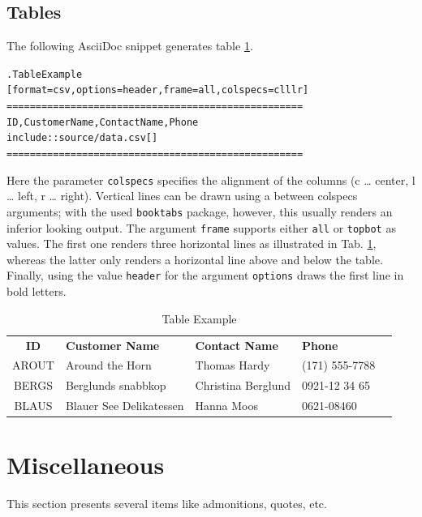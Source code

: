 \documentclass[10pt,a4paper,oneside,BCOR5mm]{scrartcl}
\begin{document}
\section{Tables}
\label{_tables}
 \par\noindent{}The following AsciiDoc snippet generates table \hyperlink{tab1}{1}.
\begin{alltt}.Table Example
[format=\textquotedbl{}csv\textquotedbl{},options=\textquotedbl{}header\textquotedbl{},frame=\textquotedbl{}all\textquotedbl{},colspecs=\textquotedbl{}clllr\textquotedbl{}]
\textbar{}===================================================
ID,Customer Name,Contact Name,Phone
include::source/data.csv[]
\textbar{}===================================================\end{alltt}
 \par\noindent{}Here the parameter \texttt{colspecs} specifies the alignment of the columns (c \dots{} center, l \dots{} left, r \dots{} right). Vertical lines can be drawn using a \texttt{\textbar{}} between colspecs arguments; with the used \texttt{booktabs} package, however, this usually renders an inferior looking output. The argument \texttt{frame} supports either \texttt{all} or \texttt{topbot} as values. The first one renders three horizontal lines as illustrated in Tab. \hyperlink{tab1}{1}, whereas the latter only renders a horizontal line above and below the table.
Finally, using the value \texttt{header} for the argument \texttt{options} draws the first line in bold letters.
  \begin{table}[!hptb]
  \begin{center}
 \hypertarget{tab1}{}
 \caption{Table Example}
 \begin{tabular}{
 clllr
 }
 \hline
 
{\bfseries{}ID} &
{\bfseries{}Customer Name} &
{\bfseries{}Contact Name} &
{\bfseries{}Phone} 
 \tabularnewline
 
AROUT &
Around the Horn &
Thomas Hardy &
(171) 555-7788 %
 \tabularnewline

BERGS &
Berglunds snabbkop &
Christina Berglund &
0921-12 34 65 %
 \tabularnewline

BLAUS &
Blauer See Delikatessen &
Hanna Moos &
0621-08460 %
 \tabularnewline
 \hline
 \end{tabular}
  \end{center}
 \label{tab1}
  \end{table}
\hypertarget{_miscellaneous}{}
\chapter{Miscellaneous}
\label{_miscellaneous}
 \par\noindent{}This section presents several items like admonitions, quotes, etc.
\hypertarget{_admonitions}{}
\end{document}
